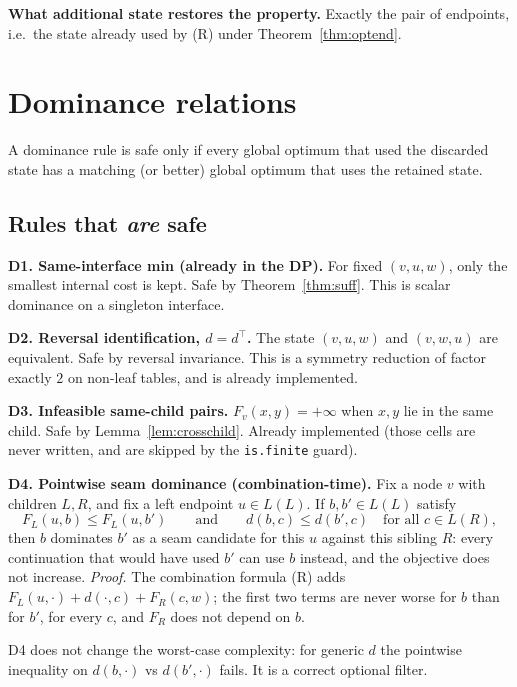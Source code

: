 \documentclass[11pt]{article}
\theoremstyle{plain}
\begin{document}
\textbf{What additional state restores the property.} Exactly the pair of
endpoints, i.e.\ the state already used by (R) under
Theorem~\ref{thm:optend}.

\section{Dominance relations}
\label{sec:dom}

A dominance rule is safe only if every global optimum that used the discarded
state has a matching (or better) global optimum that uses the retained state.

\subsection{Rules that \emph{are} safe}

\textbf{D1. Same-interface min (already in the DP).} For fixed \((v,u,w)\),
only the smallest internal cost is kept. Safe by Theorem~\ref{thm:suff}. This
is scalar dominance on a singleton interface.

\textbf{D2. Reversal identification, \(d = d^\top\).} The state \((v,u,w)\) and
\((v,w,u)\) are equivalent. Safe by reversal invariance. This is a symmetry
reduction of factor exactly \(2\) on non-leaf tables, and is already implemented.

\textbf{D3. Infeasible same-child pairs.} \(F_v(x,y) = +\infty\) when \(x,y\)
lie in the same child. Safe by Lemma~\ref{lem:crosschild}. Already implemented
(those cells are never written, and are skipped by the \texttt{is.finite}
guard).

\textbf{D4. Pointwise seam dominance (combination-time).} Fix a node \(v\)
with children \(L,R\), and fix a left endpoint \(u \in L(L)\). If
\(b, b' \in L(L)\) satisfy
\[
F_L(u,b) \le F_L(u,b')
\qquad\text{and}\qquad
d(b,c) \le d(b',c)
\quad\text{for all }c \in L(R),
\]
then \(b\) dominates \(b'\) as a seam candidate for this \(u\) against this
sibling \(R\): every continuation that would have used \(b'\) can use \(b\)
instead, and the objective does not increase. \emph{Proof.} The combination
formula (R) adds \(F_L(u,\cdot) + d(\cdot,c) + F_R(c,w)\); the first two terms
are never worse for \(b\) than for \(b'\), for every \(c\), and \(F_R\) does not
depend on \(b\).

D4 does not change the worst-case complexity: for generic \(d\) the pointwise
inequality on \(d(b,\cdot)\) vs \(d(b',\cdot)\) fails. It is a correct optional
filter.
\end{document}
